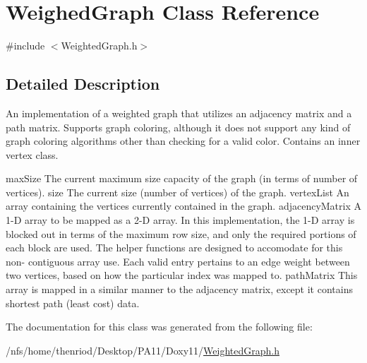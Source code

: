 \hypertarget{class_weighed_graph}{\section{\-Weighed\-Graph \-Class \-Reference}
\label{class_weighed_graph}
}


{\ttfamily \#include $<$\-Weighted\-Graph.\-h$>$}



\subsection{\-Detailed \-Description}
\-An implementation of a weighted graph that utilizes an adjacency matrix and a path matrix. \-Supports graph coloring, although it does not support any kind of graph coloring algorithms other than checking for a valid color. \-Contains an inner vertex class.

max\-Size \-The current maximum size capacity of the graph (in terms of number of vertices).  size \-The current size (number of vertices) of the graph.  vertex\-List \-An array containing the vertices currently contained in the graph.  adjacency\-Matrix \-A 1-\/\-D array to be mapped as a 2-\/\-D array. \-In this implementation, the 1-\/\-D array is blocked out in terms of the maximum row size, and only the required portions of each block are used. \-The helper functions are designed to accomodate for this non-\/ contiguous array use. \-Each valid entry pertains to an edge weight between two vertices, based on how the particular index was mapped to.  path\-Matrix \-This array is mapped in a similar manner to the adjacency matrix, except it contains shortest path (least cost) data. 

\-The documentation for this class was generated from the following file\-:\begin{DoxyCompactItemize}
\item 
/nfs/home/thenriod/\-Desktop/\-P\-A11/\-Doxy11/\hyperlink{_weighted_graph_8h}{\-Weighted\-Graph.\-h}\end{DoxyCompactItemize}
